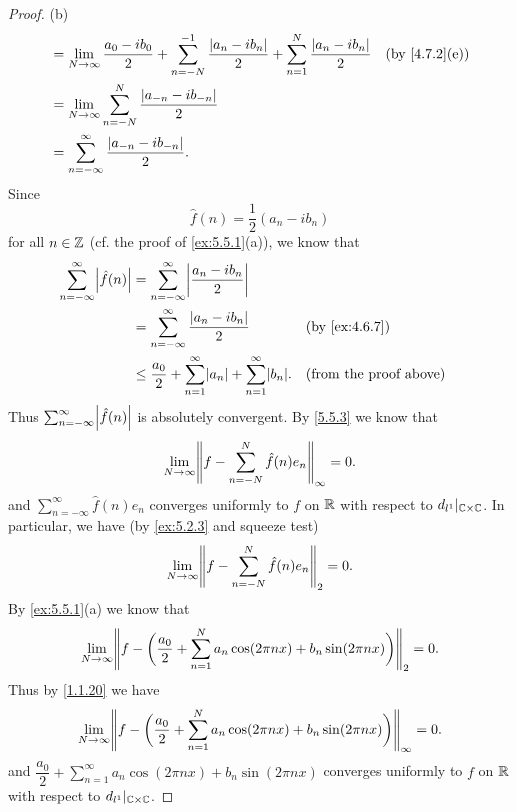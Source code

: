 \begin{proof}{(b)}
\begin{align*}
     & = \lim_{N \to \infty} \dfrac{a_0 - i b_0}{2} + \sum_{n = -N}^{-1} \dfrac{\abs{a_n - i b_n}}{2} + \sum_{n = 1}^N \dfrac{\abs{a_n - i b_n}}{2} &  & \text{(by \cref{4.7.2}(e))} \\
     & = \lim_{N \to \infty} \sum_{n = -N}^N \dfrac{\abs{a_{-n} - i b_{-n}}}{2}                                                                                                      \\
     & = \sum_{n = -\infty}^\infty \dfrac{\abs{a_{-n} - i b_{-n}}}{2}.
  \end{align*}
  Since
  \[
    \hat{f}(n) = \dfrac{1}{2} (a_n - i b_n)
  \]
  for all \(n \in \mathbb{Z}\) (cf. the proof of \cref{ex:5.5.1}(a)), we know that
  \begin{align*}
    \sum_{n = -\infty}^\infty \abs{\hat{f}(n)} & = \sum_{n = -\infty}^\infty \abs{\dfrac{a_n - i b_n}{2}}                                                                \\
                                               & = \sum_{n = -\infty}^\infty \dfrac{\abs{a_n - i b_n}}{2}                             &  & \text{(by \cref{ex:4.6.7})}   \\
                                               & \leq \dfrac{a_0}{2} + \sum_{n = 1}^\infty \abs{a_n} + \sum_{n = 1}^\infty \abs{b_n}. &  & \text{(from the proof above)}
  \end{align*}
  Thus \(\sum_{n = -\infty}^\infty \abs{\hat{f}(n)}\) is absolutely convergent.
  By \cref{5.5.3} we know that
  \[
    \lim_{N \to \infty} \norm*{f - \sum_{n = -N}^N \hat{f}(n) e_n}_{\infty} = 0.
  \]
  and \(\sum_{n = -\infty}^\infty \hat{f}(n) e_n\) converges uniformly to \(f\) on \(\mathbb{R}\) with respect to \(d_{l^1}|_{\mathbb{C} \times \mathbb{C}}\).
  In particular, we have (by \cref{ex:5.2.3} and squeeze test)
  \[
    \lim_{N \to \infty} \norm*{f - \sum_{n = -N}^N \hat{f}(n) e_n}_2 = 0.
  \]
  By \cref{ex:5.5.1}(a) we know that
  \[
    \lim_{N \to \infty} \norm*{f - \bigg(\dfrac{a_0}{2} + \sum_{n = 1}^N a_n \cos(2 \pi n x) + b_n \sin(2 \pi n x)\bigg)}_2 = 0.
  \]
  Thus by \cref{1.1.20} we have
  \[
    \lim_{N \to \infty} \norm*{f - \bigg(\dfrac{a_0}{2} + \sum_{n = 1}^N a_n \cos(2 \pi n x) + b_n \sin(2 \pi n x)\bigg)}_{\infty} = 0.
  \]
  and \(\dfrac{a_0}{2} + \sum_{n = 1}^\infty a_n \cos(2 \pi n x) + b_n \sin(2 \pi n x)\) converges uniformly to \(f\) on \(\mathbb{R}\) with respect to \(d_{l^1}|_{\mathbb{C} \times \mathbb{C}}\).
\end{proof}

